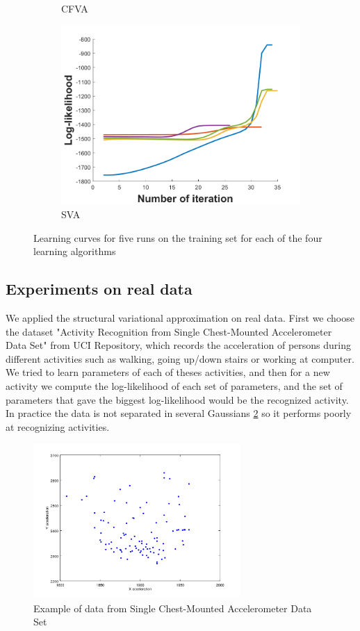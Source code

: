 \documentclass{article}
\begin{document}
\begin{figure}
\begin{subfigure}[b]{0.5\linewidth}
    \caption{CFVA} 
  \end{subfigure}%
  \begin{subfigure}[b]{0.5\linewidth}
    \centering
    \includegraphics[width=0.75\linewidth]{init_sva.png} 
    \caption{SVA} 
  \end{subfigure} 
  \caption{Learning curves for five runs on the training set for each of the four learning algorithms}
  \label{fig4} 
\end{figure}

\subsection{Experiments on real data}

We applied the structural variational approximation on real data. First we choose the dataset "Activity Recognition from Single Chest-Mounted Accelerometer Data Set" from UCI Repository, which records the acceleration of persons during different activities such as walking, going up/down stairs or working at computer. We tried to learn parameters of each of theses activities, and then for a new activity we compute the log-likelihood of each set of parameters, and the set of parameters that gave the biggest log-likelihood would be the recognized activity. In practice the data is not separated in several Gaussians \ref{fig5} so it performs poorly at recognizing activities.

\begin{figure}[h]
	\centering
	\includegraphics[width=0.7\textwidth]{standing.png}
	\caption{Example of data from Single Chest-Mounted Accelerometer Data Set}
	\label{fig5}
\end{figure}
\end{document}
